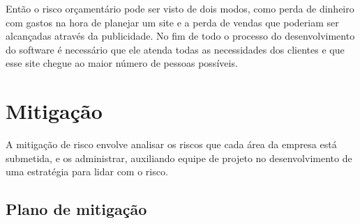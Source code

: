 \documentclass[12pt]{article}
\begin{document}
          \begin{table}[h]
            \centering
            \caption{Preferência de local para ver filme}
            \label{table:preferencia_local_ver_filme}
        \end{table}
        \FloatBarrier
    
    Então o risco orçamentário pode ser visto de dois modos, como perda de dinheiro com gastos na hora de planejar um site e a perda de vendas que poderiam ser alcançadas através da publicidade.
    No fim de todo o processo do desenvolvimento do software é necessário que ele atenda todas as necessidades dos clientes e que esse site chegue ao maior número de pessoas possíveis.


    \section{Mitigação}
        A mitigação de risco envolve analisar os riscos que cada área da empresa está submetida, e os administrar, auxiliando equipe  de  projeto  no  desenvolvimento  de  uma  estratégia  para  lidar  com  o  risco.
        \subsection{Plano de mitigação}
        
\end{document}

